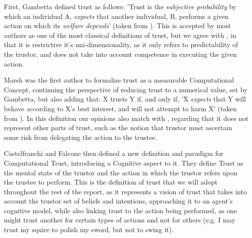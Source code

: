 \begin{itemize}
	\tallitem First, Gambetta\cite{Gambetta1988} defined trust as follows: 'Trust is the \textit{subjective probability} by which an individual A, \textit{expects} that another individual, B, performs a given action on which its \textit{welfare depends}' (taken from \cite{Castelfranchi2010}). This is accepted by most authors as one of the most classical definitions of trust, but we agree with \cite{Castelfranchi2010}, in that it is restrictive it's uni-dimensionality, as it only refers to predictability of the trustor, and does not take into account competence in executing the given action.
	
	\tallitem Marsh\cite{Marsh1994} was the first author to formalize trust as a measurable Computational Concept, continuing the perspective of reducing trust to a numerical value, set by Gambetta\cite{Gambetta1988}, but also adding that: X trusts Y if, and only if, 'X \textit{expects} that Y will behave according to X's best interest, and will not attempt to harm X' (taken from \cite{Castelfranchi2010}). In this definition our opinions also match with \cite{Castelfranchi2010}, regarding that it does not represent other parts of trust, such as the notion that trustor must ascertain some risk from delegating the action to the trustee.
	
	\tallitem Castelfranchi and Falcone then defined a new definition and paradigm for Computational Trust, introducing a Cognitive aspect to it\cite{Castelfranchi1998}. They define Trust as the mental state of the trustor and the action in which the trustor refers upon the trustee to perform. This is the definition of trust that we will adopt throughout the rest of the report, as it represents a vision of trust that takes into account the trustor set of beliefs and intentions, approaching it to an agent's cognitive model, while also linking trust to the action being performed, as one might trust another for certain types of actions and not for others (e.g. I may trust my squire to polish my sword, but not to swing it).
\end{itemize}

